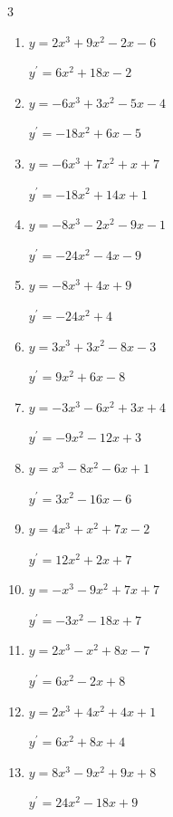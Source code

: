 \begin{multicols}{3}
\begin{enumerate}
  \item $y=2x^{3}+9x^{2}-2x-6$

        $\displaystyle y^{\prime}=6x^{2}+18x-2$

  \item $y=-6x^{3}+3x^{2}-5x-4$

        $\displaystyle y^{\prime}=-18x^{2}+6x-5$

  \item $y=-6x^{3}+7x^{2}+x+7$

        $\displaystyle y^{\prime}=-18x^{2}+14x+1$

  \item $y=-8x^{3}-2x^{2}-9x-1$

        $\displaystyle y^{\prime}=-24x^{2}-4x-9$

  \item $y=-8x^{3}+4x+9$

        $\displaystyle y^{\prime}=-24x^{2}+4$

  \item $y=3x^{3}+3x^{2}-8x-3$

        $\displaystyle y^{\prime}=9x^{2}+6x-8$

  \item $y=-3x^{3}-6x^{2}+3x+4$

        $\displaystyle y^{\prime}=-9x^{2}-12x+3$

  \item $y=x^{3}-8x^{2}-6x+1$

        $\displaystyle y^{\prime}=3x^{2}-16x-6$

  \item $y=4x^{3}+x^{2}+7x-2$

        $\displaystyle y^{\prime}=12x^{2}+2x+7$

  \item $y=-x^{3}-9x^{2}+7x+7$

        $\displaystyle y^{\prime}=-3x^{2}-18x+7$

  \item $y=2x^{3}-x^{2}+8x-7$

        $\displaystyle y^{\prime}=6x^{2}-2x+8$

\columnbreak %

  \item $y=2x^{3}+4x^{2}+4x+1$

        $\displaystyle y^{\prime}=6x^{2}+8x+4$

  \item $y=8x^{3}-9x^{2}+9x+8$

        $\displaystyle y^{\prime}=24x^{2}-18x+9$


\end{enumerate}
\end{multicols}
